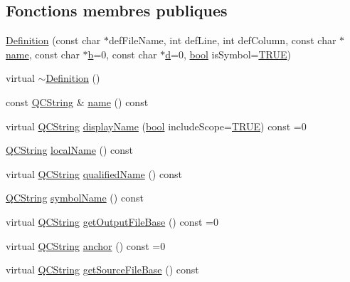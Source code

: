 \subsection*{Fonctions membres publiques}
\begin{DoxyCompactItemize}
\item 
\hyperlink{class_definition_afdf318b0b806e2b5b1fcdcf682bc338b}{Definition} (const char $\ast$def\+File\+Name, int def\+Line, int def\+Column, const char $\ast$\hyperlink{class_definition_a99481361779e85f0c1556709de7d9e5b}{name}, const char $\ast$\hyperlink{060__command__switch_8tcl_a68bdb74c144118d936931c46f75d4b3e}{b}=0, const char $\ast$\hyperlink{060__command__switch_8tcl_af43f4b1f0064a33b2d662af9f06d3a00}{d}=0, \hyperlink{qglobal_8h_a1062901a7428fdd9c7f180f5e01ea056}{bool} is\+Symbol=\hyperlink{qglobal_8h_a04a6422a52070f0dc478693da640242b}{T\+R\+U\+E})
\item 
virtual \hyperlink{class_definition_a37def2c2ca8cdc02e9f614657169e654}{$\sim$\+Definition} ()
\item 
const \hyperlink{class_q_c_string}{Q\+C\+String} \& \hyperlink{class_definition_a99481361779e85f0c1556709de7d9e5b}{name} () const 
\item 
virtual \hyperlink{class_q_c_string}{Q\+C\+String} \hyperlink{class_definition_a1b91108fe07355f62c150aa59d048e49}{display\+Name} (\hyperlink{qglobal_8h_a1062901a7428fdd9c7f180f5e01ea056}{bool} include\+Scope=\hyperlink{qglobal_8h_a04a6422a52070f0dc478693da640242b}{T\+R\+U\+E}) const  =0
\item 
\hyperlink{class_q_c_string}{Q\+C\+String} \hyperlink{class_definition_ae4fa9ca0807ec16be5b9b4606a5f4ba9}{local\+Name} () const 
\item 
virtual \hyperlink{class_q_c_string}{Q\+C\+String} \hyperlink{class_definition_aacd9b72da80deb37974a18d2001ed715}{qualified\+Name} () const 
\item 
\hyperlink{class_q_c_string}{Q\+C\+String} \hyperlink{class_definition_a0b672c0534ecbd81ae77584d2ceae7ff}{symbol\+Name} () const 
\item 
virtual \hyperlink{class_q_c_string}{Q\+C\+String} \hyperlink{class_definition_ad75f413f3ae0ebc08b59fa1b247c35fa}{get\+Output\+File\+Base} () const  =0
\item 
virtual \hyperlink{class_q_c_string}{Q\+C\+String} \hyperlink{class_definition_a819e24e160dd283a4e802da6f5c00d2c}{anchor} () const  =0
\item 
virtual \hyperlink{class_q_c_string}{Q\+C\+String} \hyperlink{class_definition_a0f46392152220490ed6e00959fac1b7e}{get\+Source\+File\+Base} () const 

\end{DoxyCompactItemize}
